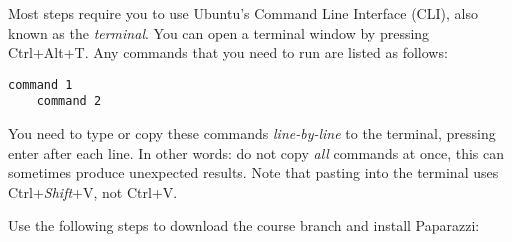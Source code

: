 Most steps require you to use Ubuntu's Command Line Interface (CLI), also known as the \emph{terminal}. You can open a terminal window by pressing Ctrl+Alt+T. Any commands that you need to run are listed as follows:

\begin{lstlisting}[style=Bash]
	command 1
	command 2
\end{lstlisting}

You need to type or copy these commands \emph{line-by-line} to the terminal, pressing enter after each line. In other words: do not copy \emph{all} commands at once, this can sometimes produce unexpected results. Note that pasting into the terminal uses Ctrl+\emph{Shift}+V, not Ctrl+V.

Use the following steps to download the course branch and install Paparazzi:

